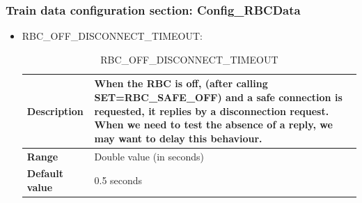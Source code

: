 \documentclass{template/openetcs}
\begin{document}
\subsubsection{Train data configuration section: Config\_RBCData}
	\begin{itemize}
			\item RBC\_OFF\_DISCONNECT\_TIMEOUT:
											
			\begin{longtable}{|l|l|}
				\caption{RBC\_OFF\_DISCONNECT\_TIMEOUT}\\ 
				\hline
				
					\begin{minipage}[t]{0.22\linewidth} \textbf{Description}	\end{minipage} 
				&	\begin{minipage}[t]{0.78\linewidth} When the RBC is off, (after calling SET=RBC\_SAFE\_OFF) and a safe connection is requested, it replies by a disconnection request. When we need to test the absence of a reply, we may want to delay this behaviour. \end{minipage} \\
				
				\hline
																																									
					\begin{minipage}[t]{0.22\linewidth} \textbf{Range}	\end{minipage} 
				&	\begin{minipage}[t]{0.78\linewidth} Double value (in seconds) \end{minipage} \\
				
				\hline
				
					\begin{minipage}[t]{0.22\linewidth} \textbf{Default value}	\end{minipage} 
				&	\begin{minipage}[t]{0.78\linewidth} 0.5 seconds \end{minipage} \\
				
				\hline				
			\end{longtable}	
	\end{itemize}
\end{document}
